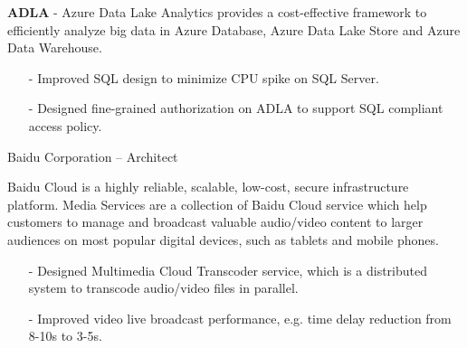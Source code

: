 \documentclass[10pt,a4paper]{moderncv}
\begin{document}
\vspace{1ex}
{
    \textbf{ADLA} - Azure Data Lake Analytics provides a cost-effective framework to efficiently analyze big data in Azure Database, Azure Data Lake Store and Azure Data Warehouse.
    \begin{itemize}
		\item[-] Improved SQL design to minimize CPU spike on SQL Server.
		\item[-] Designed fine-grained authorization on ADLA to support SQL compliant access policy.
	\end{itemize}
}
\vspace{2ex}

\pagebreak
	{ Baidu Corporation -- Architect}{}{}{}{}
	\vspace{1ex}

{
	 Baidu Cloud is a highly reliable, scalable, low-cost, secure infrastructure platform.
	 Media Services are a collection of Baidu Cloud service which help customers to manage and broadcast valuable audio/video content to larger audiences on most popular digital devices, such as tablets and mobile phones.
	 \begin{itemize}
		\item[-] Designed Multimedia Cloud Transcoder service, which is a distributed system to transcode audio/video files in parallel.
		\item[-] Improved video live broadcast performance, e.g. time delay reduction from 8-10s to 3-5s.
	 \end{itemize}
}

\vspace{2ex}
\vspace*{0.4\baselineskip}
\end{document}
